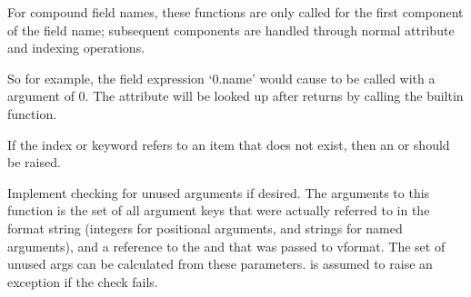 \documentclass[letterpaper,10pt,english]{sphinxmanual}
\begin{document}
\begin{fulllineitems}
\begin{fulllineitems}
For compound field names, these functions are only called for the first
component of the field name; subsequent components are handled through
normal attribute and indexing operations.

So for example, the field expression ‘0.name’ would cause
{\hyperref[\detokenize{string:string.Formatter.get_value}]{}} to be called with a  argument of 0.  The 
attribute will be looked up after {\hyperref[\detokenize{string:string.Formatter.get_value}]{}} returns by calling the
built\sphinxhyphen{}in  function.

If the index or keyword refers to an item that does not exist, then an
 or  should be raised.

\end{fulllineitems}


\vspace{5px}

\begin{fulllineitems}
\label{\detokenize{string:string.Formatter.check_unused_args}}
Implement checking for unused arguments if desired.  The arguments to this
function is the set of all argument keys that were actually referred to in
the format string (integers for positional arguments, and strings for
named arguments), and a reference to the  and  that was
passed to vformat.  The set of unused args can be calculated from these
parameters.  {\hyperref[\detokenize{string:string.Formatter.check_unused_args}]{}} is assumed to raise an exception if
the check fails.

\end{fulllineitems}



\end{fulllineitems}
\end{document}
